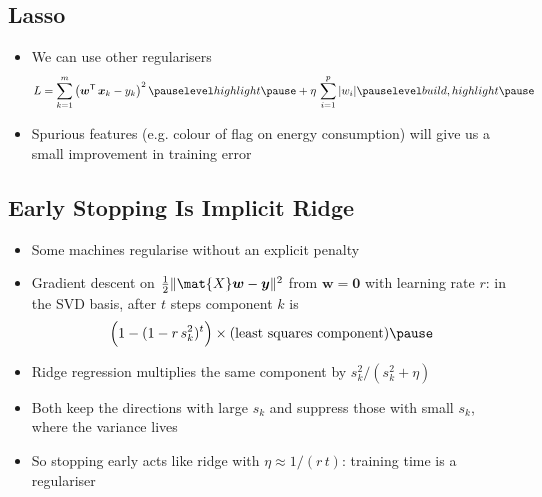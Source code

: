 
\begin{slide}
\section[-2.5]{Lasso}

\pb
\begin{itemize}\squeeze
\item We can use other regularisers
  \begin{align*}
    L = \sum_{k=1}^m \left( \bm{w}^\tr \, \bm{x}_k - y_k \right)^2\pauseh
    + \eta \, \sum_{i=1}^p |w_i| \pauseb
  \end{align*}
\item Spurious features (e.g. colour of flag on energy consumption) will
  give us a small improvement in training error\pauseh
  \begin{center}
    \pause
  \end{center}
\end{itemize}


\end{slide}


\begin{slide}
\section[-2]{Early Stopping Is Implicit Ridge}

\begin{PauseHighLight}
  \begin{itemize}\squeeze
  \item Some machines regularise without an explicit penalty\pause
  \item Gradient descent on $\frac12\|\mat{X}\bm{w}-\bm{y}\|^2$ from
    $\bm{w}=\bm{0}$ with learning rate $r$: in the SVD basis, after $t$
    steps component $k$ is
    \begin{align*}
      \Bigl(1 - (1 - r\,s_k^2)^t\Bigr) \times \text{(least squares
      component)}\pause
    \end{align*}
  \item Ridge regression multiplies the same component by
    $s_k^2/(s_k^2+\eta)$\pause
  \item Both keep the directions with large $s_k$ and suppress those with
    small $s_k$, where the variance lives\pause
  \item So stopping early acts like ridge with $\eta\approx1/(r\,t)$:
    training time is a regulariser\pause
  \end{itemize}
\end{PauseHighLight}

\end{slide}


